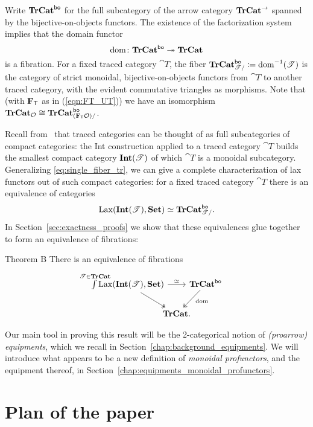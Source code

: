 \documentclass[11pt,oneside,article]{memoir}
\begin{document}
Write $\mathbf{TrCat}^{\mathsf{bo}}$ for the full subcategory of the arrow category $\mathbf{TrCat}^{\to}$ spanned by the
bijective-on-objects functors. The existence of the factorization system implies that the domain
functor
\[
  \operatorname{dom}\colon\mathbf{TrCat}^{\mathsf{bo}}\twoheadrightarrow\mathbf{TrCat}
\]
is a fibration. For a fixed traced category $\cat{T}$, the fiber
$\mathbf{TrCat}^{\mathsf{bo}}_{\mathscr{T}/}\coloneqq\operatorname{dom}^{-1}(\mathscr{T})$ is the category of strict monoidal,
bijective-on-objects functors from $\cat{T}$ to another traced category, with the evident
commutative triangles as morphisms. Note that (with $\mathbf{F}_{\mathsf{T}}$ as in (\ref{eqn:FT_UT})) we have an isomorphism
$\mathbf{TrCat}_{\mathcal{O}}\cong\mathbf{TrCat}^{\mathsf{bo}}_{(\mathbf{F}_{\mathsf{T}}\mathcal{O})/}$.

Recall from~\cite{JoyalStreetVerity} that traced categories can be thought of as full subcategories
of compact categories: the Int construction applied to a traced category $\cat{T}$ builds the
smallest compact category $\mathbf{Int}(\mathscr{T})$ of which $\cat{T}$ is a monoidal subcategory. Generalizing
\eqref{eq:single_fiber_tr}, we can give a complete characterization of lax functors out of such
compact categories: for a fixed traced category $\cat{T}$ there is an equivalence of categories
\[
  \operatorname{Lax}(\mathbf{Int}(\mathscr{T}),\mathbf{Set})\simeq\mathbf{TrCat}^{\mathsf{bo}}_{\mathscr{T}/}.
\]
In Section~\ref{sec:exactness_proofs} we show that these equivalences glue together to form an
equivalence of fibrations:

\begin{named}{Theorem B}
    \label{thm:TheoremB_statement}
  There is an equivalence of fibrations
  \begin{equation*}
    \begin{tikzcd}[column sep=-1em]
      \int\limits^{\mathclap{\cat{T}\in\TrCat}} \Lax(\Int(\cat{T}),\Set)
        \ar[rr,"\equiv"] \ar[dr,two heads]
      && \TrCat^{\bo} \ar[dl,two heads,"\dom" pos=.4] \\
      & \TrCat. &
    \end{tikzcd}
  \end{equation*}
\end{named}

Our main tool in proving this result will be the 2-categorical notion of \emph{(proarrow)
equipments}, which we recall in Section~\ref{chap:background_equipments}. We will introduce what
appears to be a new definition of \emph{monoidal profunctors}, and the equipment thereof, in
Section~\ref{chap:equipments_monoidal_profunctors}.

\section{Plan of the paper}
\end{document}
